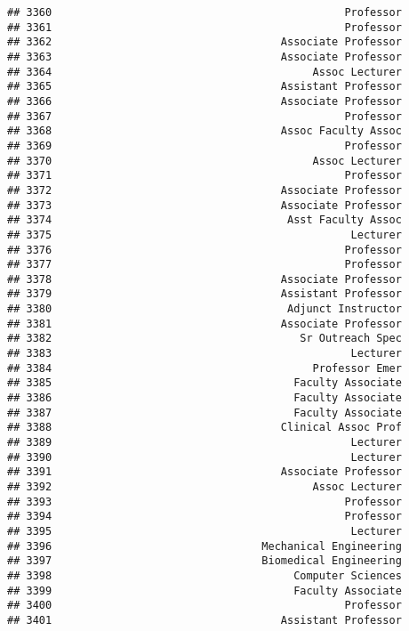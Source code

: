 \documentclass[
]{article}
\begin{document}
\begin{verbatim}
## 3360                                              Professor
## 3361                                              Professor
## 3362                                    Associate Professor
## 3363                                    Associate Professor
## 3364                                         Assoc Lecturer
## 3365                                    Assistant Professor
## 3366                                    Associate Professor
## 3367                                              Professor
## 3368                                    Assoc Faculty Assoc
## 3369                                              Professor
## 3370                                         Assoc Lecturer
## 3371                                              Professor
## 3372                                    Associate Professor
## 3373                                    Associate Professor
## 3374                                     Asst Faculty Assoc
## 3375                                               Lecturer
## 3376                                              Professor
## 3377                                              Professor
## 3378                                    Associate Professor
## 3379                                    Assistant Professor
## 3380                                     Adjunct Instructor
## 3381                                    Associate Professor
## 3382                                       Sr Outreach Spec
## 3383                                               Lecturer
## 3384                                         Professor Emer
## 3385                                      Faculty Associate
## 3386                                      Faculty Associate
## 3387                                      Faculty Associate
## 3388                                    Clinical Assoc Prof
## 3389                                               Lecturer
## 3390                                               Lecturer
## 3391                                    Associate Professor
## 3392                                         Assoc Lecturer
## 3393                                              Professor
## 3394                                              Professor
## 3395                                               Lecturer
## 3396                                 Mechanical Engineering
## 3397                                 Biomedical Engineering
## 3398                                      Computer Sciences
## 3399                                      Faculty Associate
## 3400                                              Professor
## 3401                                    Assistant Professor

\end{verbatim}
\end{document}
